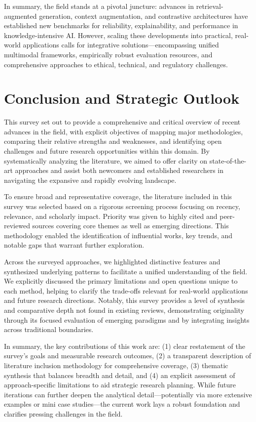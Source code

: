\documentclass[sigconf]{acmart}
\begin{document}
In summary, the field stands at a pivotal juncture: advances in retrieval-augmented generation, context augmentation, and contrastive architectures have established new benchmarks for reliability, explainability, and performance in knowledge-intensive AI. However, scaling these developments into practical, real-world applications calls for integrative solutions—encompassing unified multimodal frameworks, empirically robust evaluation resources, and comprehensive approaches to ethical, technical, and regulatory challenges.

\section{Conclusion and Strategic Outlook}

This survey set out to provide a comprehensive and critical overview of recent advances in the field, with explicit objectives of mapping major methodologies, comparing their relative strengths and weaknesses, and identifying open challenges and future research opportunities within this domain. By systematically analyzing the literature, we aimed to offer clarity on state-of-the-art approaches and assist both newcomers and established researchers in navigating the expansive and rapidly evolving landscape.

To ensure broad and representative coverage, the literature included in this survey was selected based on a rigorous screening process focusing on recency, relevance, and scholarly impact. Priority was given to highly cited and peer-reviewed sources covering core themes as well as emerging directions. This methodology enabled the identification of influential works, key trends, and notable gaps that warrant further exploration.

Across the surveyed approaches, we highlighted distinctive features and synthesized underlying patterns to facilitate a unified understanding of the field. We explicitly discussed the primary limitations and open questions unique to each method, helping to clarify the trade-offs relevant for real-world applications and future research directions. Notably, this survey provides a level of synthesis and comparative depth not found in existing reviews, demonstrating originality through its focused evaluation of emerging paradigms and by integrating insights across traditional boundaries.

In summary, the key contributions of this work are: (1) clear restatement of the survey's goals and measurable research outcomes, (2) a transparent description of literature inclusion methodology for comprehensive coverage, (3) thematic synthesis that balances breadth and detail, and (4) an explicit assessment of approach-specific limitations to aid strategic research planning. While future iterations can further deepen the analytical detail—potentially via more extensive examples or mini case studies—the current work lays a robust foundation and clarifies pressing challenges in the field.
\end{document}
